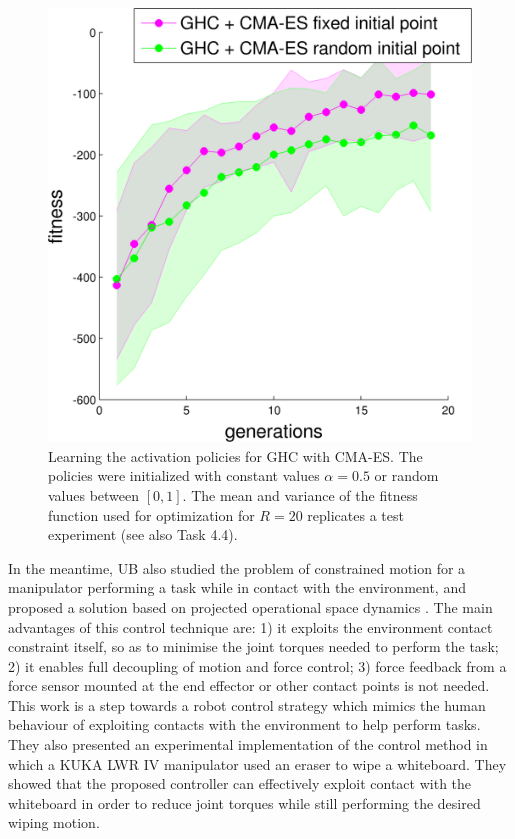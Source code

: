 \begin{figure}[h!]
  \centering
  \includegraphics[width=0.5\hsize]{images/GHC_robust}
\caption{Learning the activation policies for GHC with CMA-ES. The policies were initialized with constant values $\alpha=0.5$ or random values between $[0,1]$. The mean and variance of the fitness function used for optimization for $R=20$ replicates a test experiment (see also Task 4.4).}
\label{fig:robust}
\end{figure}

In the meantime, UB also studied the problem of constrained motion for a manipulator performing
a task while in contact with the environment, and proposed a solution based on
projected operational space dynamics \cite{Ortenzietal14}.  The main
advantages of this control technique are: 1) it exploits the environment
contact constraint itself, so as to minimise the joint torques needed to
perform the task; 2) it enables full decoupling of motion and force control;
3) force feedback from a force sensor mounted at the end effector or other
contact points is not needed.  This work is a step towards a robot control
strategy which mimics the human behaviour of exploiting contacts with the
environment to help perform tasks.  They also presented an experimental
implementation of the control method in which a KUKA LWR IV manipulator used
an eraser to wipe a whiteboard.  They showed that the proposed controller can
effectively exploit contact with the whiteboard in order to reduce joint
torques while still performing the desired wiping motion.

